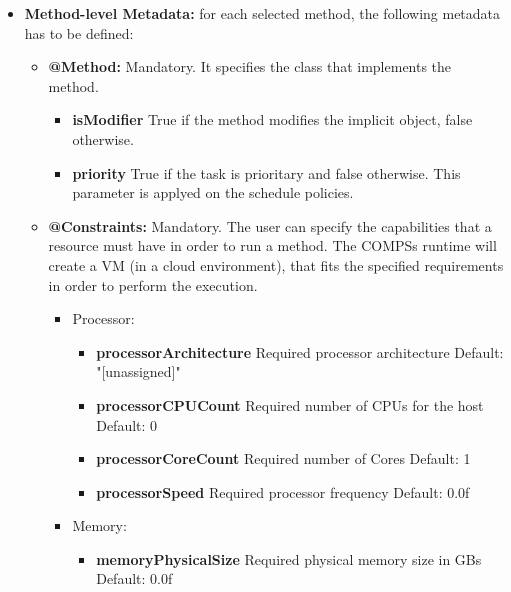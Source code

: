 \begin{itemize}
 \item {\bf Method-level Metadata:} for each selected method, the following metadata has to be defined:
       \begin{itemize}
         \item {\bf @Method:} Mandatory. It specifies the class that implements the method.
		\begin{itemize}
			\item \textbf{isModifier} True if the method modifies the implicit object, false otherwise.
			\item \textbf{priority} True if the task is prioritary and false otherwise. This parameter is applyed on the
			schedule policies. 
		\end{itemize}
         \item {\bf @Constraints:} Mandatory. The user can specify the capabilities that a resource must have in order
               to run a method. The COMPSs runtime will create a VM (in a cloud environment), that fits the
               specified requirements in order to perform the execution.
               \begin{itemize}
                 \item Processor:
                       \begin{itemize}
			  \item \textbf{processorArchitecture} Required processor architecture \newline
                                                               Default: "[unassigned]"
			  \item \textbf{processorCPUCount} Required number of CPUs for the host \newline
							   Default: 0
			  \item \textbf{processorCoreCount} Required number of Cores \newline
							    Default: 1
			  \item \textbf{processorSpeed} Required processor frequency \newline
							Default: 0.0f
                       \end{itemize}
                \item Memory:
                       \begin{itemize}
			  \item \textbf{memoryPhysicalSize} Required physical memory size in GBs \newline
                                                            Default: 0.0f

\end{itemize}
\end{itemize}
\end{itemize}
\end{itemize}
